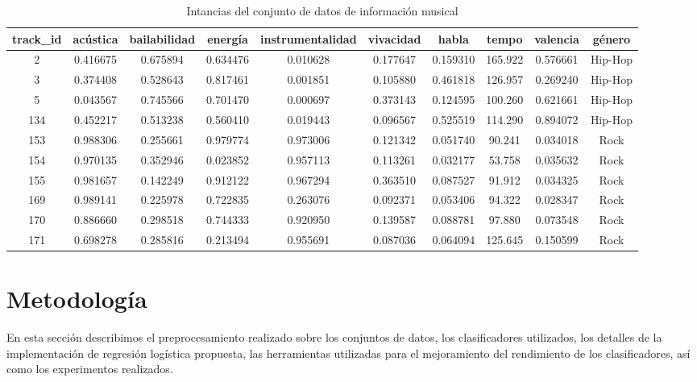\documentclass[runningheads]{llncs}
\begin{document}
\begin{table}[h]
    \centering
    \begin{adjustwidth}{-.5in}{-.5in}
    \begin{tabular}{|c|c|c|c|c|c|c|c|c|c|}
    \hline
    track\_id & acústica & bailabilidad & energía & instrumentalidad & vivacidad & habla & tempo & valencia & género \\
    \hline
    2 & 0.416675 & 0.675894 & 0.634476 & 0.010628 & 0.177647 & 0.159310 & 165.922 & 0.576661 & Hip-Hop \\
    3 & 0.374408 & 0.528643 & 0.817461 & 0.001851 & 0.105880 & 0.461818 & 126.957 & 0.269240 & Hip-Hop \\
    5 & 0.043567 & 0.745566 & 0.701470 & 0.000697 & 0.373143 & 0.124595 & 100.260 & 0.621661 & Hip-Hop \\
    134 & 0.452217 & 0.513238 & 0.560410 & 0.019443 & 0.096567 & 0.525519 & 114.290 & 0.894072 & Hip-Hop \\
    153 & 0.988306 & 0.255661 & 0.979774 & 0.973006 & 0.121342 & 0.051740 & 90.241 & 0.034018 & Rock \\
    154 & 0.970135 & 0.352946 & 0.023852 & 0.957113 & 0.113261 & 0.032177 & 53.758 & 0.035632 & Rock \\
    155 & 0.981657 & 0.142249 & 0.912122 & 0.967294 & 0.363510 & 0.087527 & 91.912 & 0.034325 & Rock \\
    169 & 0.989141 & 0.225978 & 0.722835 & 0.263076 & 0.092371 & 0.053406 & 94.322 & 0.028347 & Rock \\
    170 & 0.886660 & 0.298518 & 0.744333 & 0.920950 & 0.139587 & 0.088781 & 97.880 & 0.073548 & Rock \\
    171 & 0.698278 & 0.285816 & 0.213494 & 0.955691 & 0.087036 & 0.064094 & 125.645 & 0.150599 & Rock \\
    \hline
    \end{tabular}
    \end{adjustwidth}
    \caption{Intancias del conjunto de datos de información musical}
    \label{tab:conjuntoMusica}
\end{table}

\section{Metodología}
En esta sección describimos el preprocesamiento realizado sobre los conjuntos de datos, los clasificadores utilizados, los detalles de la implementación de regresión logística propuesta, las herramientas utilizadas para el mejoramiento del rendimiento de los clasificadores, así como los experimentos realizados.
\end{document}
